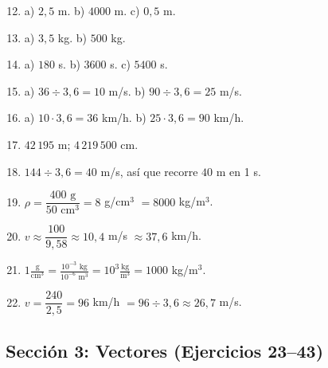 \documentclass[12pt, letterpaper]{article}
\begin{document}
  \begin{enumerate}[leftmargin=*, label=\textbf{\arabic*.}]
    \setcounter{enumi}{11}
    \item a) $2{,}5$ m. \quad b) $4000$ m. \quad c) $0{,}5$ m.
    \item a) $3{,}5$ kg. \quad b) $500$ kg.
    \item a) $180$ s. \quad b) $3600$ s. \quad c) $5400$ s.
    \item a) $36 \div 3{,}6 = 10$ m/s. \quad b) $90 \div 3{,}6 = 25$ m/s.
    \item a) $10 \cdot 3{,}6 = 36$ km/h. \quad b) $25 \cdot 3{,}6 = 90$ km/h.
    \item $42\,195$ m; $4\,219\,500$ cm.
    \item $144 \div 3{,}6 = 40$ m/s, así que recorre $40$ m en 1 s.
    \item $\rho = \dfrac{400 \text{ g}}{50 \text{ cm}^3} = 8$ g/cm$^3$ $= 8000$ kg/m$^3$.
    \item $v \approx \dfrac{100}{9{,}58} \approx 10{,}4$ m/s $\approx 37{,}6$ km/h.
    \item $1 \frac{\text{g}}{\text{cm}^3} = \frac{10^{-3} \text{ kg}}{10^{-6} \text{ m}^3} = 10^{3} \frac{\text{kg}}{\text{m}^3} = 1000$ kg/m$^3$. \checkmark
    \item $v = \dfrac{240}{2{,}5} = 96$ km/h $= 96 \div 3{,}6 \approx 26{,}7$ m/s.
  \end{enumerate}

  \subsection*{Sección 3: Vectores (Ejercicios 23--43)}
\end{document}
